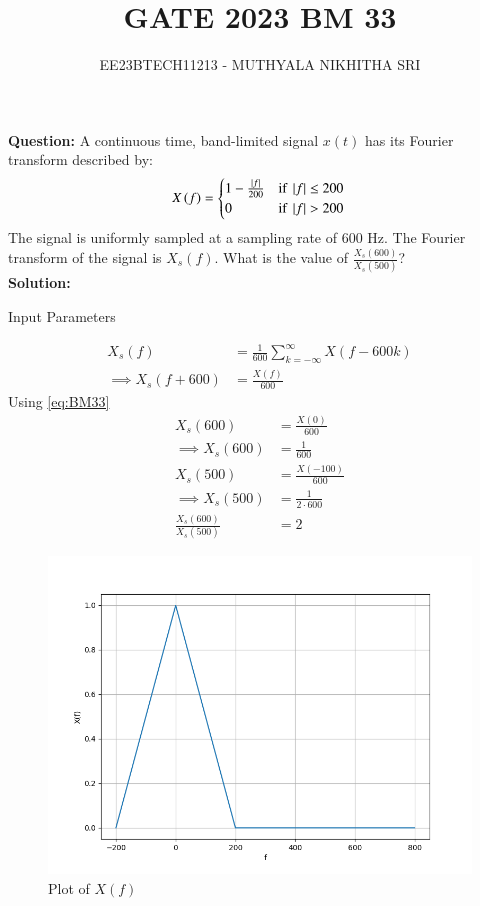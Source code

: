 \documentclass[journal,12pt,twocolumn]{IEEEtran}
\title{
	
\title{GATE 2023 BM 33}
\author{EE23BTECH11213 - MUTHYALA NIKHITHA SRI
}


}
\providecommand{\brak}[1]{\ensuremath{\left(#1\right)}}
\theoremstyle{remark}
\providecommand{\abs}[1]{\left\vert#1\right\vert}
\begin{document}
\maketitle

\textbf{Question:} 
A continuous time, band-limited signal $x\brak{t}$ has its Fourier transform described by:\\
\begin{equation}
 X\brak{f} = \begin{cases} 
1 - \frac{\abs{f}}{200} & \text{if } \abs{f} \leq 200 \\
0 & \text{if } \abs{f} > 200 \label{eq:BM33}
\end{cases}  \\
\end{equation}
The signal is uniformly sampled at a sampling rate of 600 Hz. The Fourier transform of the signal is $X_s\brak{f}$. What is the value of $\frac{X_s(600)}{X_s(500)}$? \\

\textbf{Solution: }

\begin{table}[h]
 	\centering
 	\resizebox{6 cm}{!}{
 		
 	}
 	\caption{Input Parameters}
    \label{tab:table_33}
 \end{table}

\begin{align} 
X_s\brak{f} &= \frac{1}{600} \sum_{k=-\infty}^{\infty} X\brak{f - 600k} \\
\implies X_s\brak{f+600} &= \frac{X(f)}{600} \end{align} Using \eqref{eq:BM33}
\begin{align} 
X_s\brak{600} &= \frac{X\brak{0}}{600} \\
\implies X_s\brak{600} &= \frac{1}{600} \\
X_s\brak{500} &= \frac{X\brak{-100}}{600} \\
\implies X_s\brak{500} &= \frac{1}{2\cdot 600} \\
\frac{X_s\brak{600}}{X_s\brak{500}} &= 2 
\end{align}

\begin{figure}[h!]
    \centering
    \includegraphics[width=\columnwidth]{figs/f1.png}
    \caption{Plot of $X\brak{f}$}
    \label{fig:1}
\end{figure}
\end{document}
